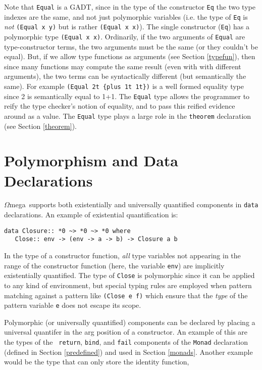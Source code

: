 \documentclass[11pt,twoside]{article}
\newcommand{\om}{$\Omega$mega}
\begin{document}
Note that {\tt Equal} is a GADT, since in the type of the constructor {\tt Eq} the two type indexes
are the same, and not just polymorphic variables (i.e. the type of
{\tt Eq} is {\em not} {\tt (Equal x y)} but is rather {\tt (Equal x x)}).
The single constructor ({\tt Eq}) has a polymorphic type {\tt(Equal x x)}.
Ordinarily, if the two arguments of {\tt Equal} are type-constructor terms,
the two arguments must be the same (or they couldn't be equal). But, if we
allow type functions as arguments (see Section \ref{typefun}), then since many functions may compute the
same result (even with with different arguments), the two terms can be
syntactically different (but semantically the same).
For example \verb+(Equal 2t {plus 1t 1t})+ is a well formed equality type
since 2 is semantically equal to 1+1.
The {\tt Equal} type allows the programmer to reify
the type checker's notion of equality, and to pass this reified evidence
around as a value. The {\tt Equal} type plays a large role
in the {\tt theorem} declaration (see Section \ref{theorem}).

\section{Polymorphism and Data Declarations}

\om\ supports both existentially and universally quantified components in {\tt data}
declarations. An example of existential quantification is:
\begin{verbatim}
data Closure:: *0 ~> *0 ~> *0 where
   Close:: env -> (env -> a -> b) -> Closure a b
\end{verbatim}
In the type of a constructor function, {\em all} type variables not appearing
in the range of the constructor function (here, the variable {\tt env})
are implicitly existentially quantified. The type of {\tt Close} is polymorphic
since it can be applied to any kind of environment, but special typing rules
are employed when pattern matching against a pattern like \verb+(Close e f)+
which ensure that the {\em type} of the pattern variable {\tt e} does not escape its scope.

Polymorphic (or universally quantified) components can be declared by placing a universal quantifer in the
arg position of a constructor. An example of this are the types of the {\tt
return}, {\tt bind}, and {\tt fail} components of the {\tt Monad} declaration
(defined in Section \ref{predefined}) and used in Section \ref{monads}. Another
example would be the type that can only store the identity function,
\end{document}
